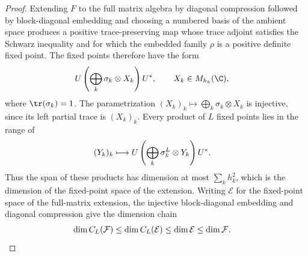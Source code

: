 \begin{proof}\leanok

    Extending $F$ to the full matrix algebra by diagonal compression followed by
    block-diagonal embedding and choosing a numbered basis of the ambient
    space produces a positive trace-preserving map whose trace adjoint
    satisfies the Schwarz inequality and for which the embedded family $\rho$ is a
    positive definite fixed point. The fixed points therefore have the form
    \begin{align}
        U\left(\bigoplus_k\sigma_k\otimes X_k\right)U^*,
        \qquad X_k & \in M_{h_k}(\C),
        \notag
    \end{align}
    where $\tr(\sigma_k)=1$. The parametrization
    $(X_k)_k\mapsto\bigoplus_k\sigma_k\otimes X_k$ is injective, since its
    left partial trace is $(X_k)_k$. Every product of $L$ fixed points lies
    in the range of
    \begin{align}
        (Y_k)_k
         & \longmapsto
        U\left(\bigoplus_k\sigma_k^L\otimes Y_k\right)U^*.
        \notag
    \end{align}
    Thus the span of these products has dimension at most
    $\sum_k h_k^2$, which is the dimension of the fixed-point space of the
    extension. Writing $\mathcal E$ for the fixed-point space of the
    full-matrix extension, the injective block-diagonal embedding and
    diagonal compression give the dimension chain
    \begin{align}
        \dim C_L(\mathcal F)
         & \leq \dim C_L(\mathcal E)
        \leq \dim\mathcal E
        \leq \dim\mathcal F.
        \notag
    \end{align}
\end{proof}

